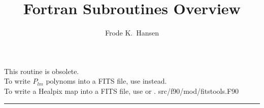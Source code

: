 
\sloppy


\title{\healpix Fortran Subroutines Overview}
 \section[write\_dbintab]{ }
\label{sub:write_dbintab}
\author{Frode K.~Hansen}

\begin{facility}
{This routine is obsolete. \\
To write $P_{lm}$ polynoms into a FITS file,
use 
instead. \\
To write a Healpix map into a FITS file,
use 
or 
.}
{src/f90/mod/fitstools.F90}
\end{facility}


\rule{\hsize}{2mm}

\newpage
